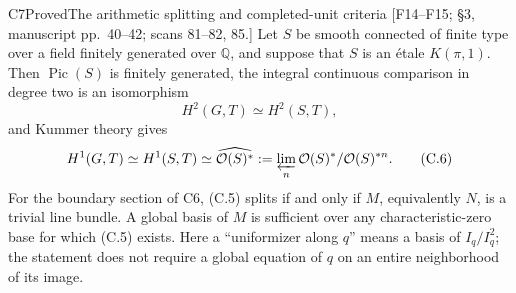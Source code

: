 \begin{result}{C7}{Proved}{The arithmetic splitting and completed-unit criteria}
\textup{[F14--F15; \S3, manuscript pp.\ 40--42; scans 81--82, 85.]}
Let $S$ be smooth connected of finite type over a field finitely generated
over $\mathbb Q$, and suppose that $S$ is an \'etale $K(\pi,1)$.
Then $\operatorname{Pic}(S)$ is finitely generated, the integral continuous
comparison in degree two is an isomorphism
\[
 H^2(G,T)\simeq H^2(S,T),
\]
and Kummer theory gives
\[
 H^1(G,T)\simeq H^1(S,T)
       \simeq\widehat{\mathcal O(S)^*}
       :=\varprojlim_n\mathcal O(S)^*/\mathcal O(S)^{*n}.       \tag{C.6}
\]
For the boundary section of C6, (C.5) splits if and only if $M$,
equivalently $N$, is a trivial line bundle. A global basis of $M$ is
sufficient over any characteristic-zero base for which (C.5) exists.
Here a ``uniformizer along $q$'' means a basis of $I_q/I_q^2$; the
statement does not require a global equation of $q$ on an entire
neighborhood of its image.
\end{result}

